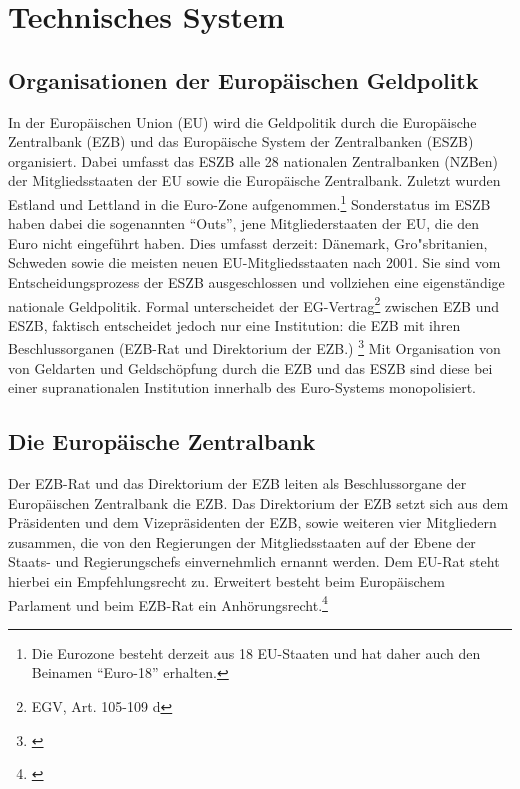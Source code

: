 \documentclass[
        onecolumn,
        a4paper,
        abstracton,
        parskip=half
        ,final
        ]{scrartcl}
\begin{document}
\section{Technisches System}
	\label{sec2:technischesSystem}



\subsection{Organisationen der Europ{\"a}ischen Geldpolitk}

In der Europ{\"a}ischen Union (EU) wird die Geldpolitik durch die Europ{\"a}ische Zentralbank (EZB) und das Europ{\"a}ische System der Zentralbanken (ESZB) organisiert. Dabei umfasst das ESZB alle 28 nationalen Zentralbanken (NZBen) der Mitgliedsstaaten der EU sowie die Europ{\"a}ische Zentralbank. Zuletzt wurden Estland und Lettland in die Euro-Zone aufgenommen.\footnote[98]{Die Eurozone besteht derzeit aus 18 EU-Staaten und hat daher auch den Beinamen "`Euro-18"' erhalten.} Sonderstatus im ESZB haben dabei die sogenannten "`Outs"', jene Mitgliederstaaten der EU, die den Euro nicht eingef{\"u}hrt haben.
Dies umfasst derzeit: D{\"a}nemark, Gro{"s}britanien, Schweden sowie die meisten neuen EU-Mitgliedsstaaten nach 2001. Sie sind vom Entscheidungsprozess der ESZB ausgeschlossen und vollziehen eine eigenst{\"a}ndige nationale Geldpolitik.
Formal unterscheidet der EG-Vertrag\footnote[25]{EGV, Art. 105-109 d} zwischen EZB und ESZB, faktisch entscheidet jedoch nur eine Institution: die EZB mit ihren Beschlussorganen (EZB-Rat und Direktorium der EZB.) \footnote[99]{\citep[vgl.][S.553]{Basseler2010}}
Mit Organisation von von Geldarten und Geldsch{\"o}pfung durch die EZB und das ESZB sind diese bei einer supranationalen Institution innerhalb des Euro-Systems monopolisiert.

\subsection{Die Europ{\"a}ische Zentralbank}

Der EZB-Rat und das Direktorium der EZB leiten als Beschlussorgane der Europ{\"a}ischen Zentralbank die EZB. Das Direktorium der EZB setzt sich aus dem Pr{\"a}sidenten und dem Vizepr{\"a}sidenten der EZB, sowie weiteren vier Mitgliedern zusammen, die von den Regierungen der Mitgliedsstaaten auf der Ebene der Staats- und Regierungschefs einvernehmlich ernannt werden. Dem EU-Rat steht hierbei ein Empfehlungsrecht zu. Erweitert besteht beim Europ{\"a}ischem Parlament und beim EZB-Rat ein Anh{\"o}rungsrecht.\footnote[46]{\citep[vgl.][S.553]{Basseler2010}}
\end{document}
